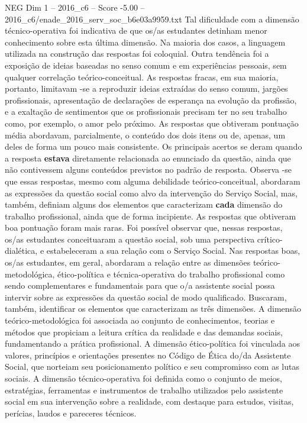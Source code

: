 \begin{textsample}{NEG Dim 1 – 2016\_c6 – Score -5.00 – 2016\_c6/enade\_2016\_serv\_soc\_b6e03a9959.txt}
Tal dificuldade com a dimensão técnico-operativa foi indicativa de que os/as estudantes detinham menor conhecimento sobre esta última dimensão.
Na maioria dos casos, a linguagem utilizada na construção das respostas foi coloquial.
Outra tendência foi a exposição de ideias baseadas no senso comum e em experiências pessoais, sem qualquer correlação teórico-conceitual.
As respostas fracas, em sua maioria, portanto, limitavam -se a reproduzir ideias extraídas do senso comum, jargões profissionais, apresentação de declarações de esperança na evolução da profissão, e a exaltação de sentimentos que os profissionais precisam ter no seu trabalho como, por exemplo, o amor pelo próximo.
As respostas que obtiveram pontuação média abordavam, parcialmente, o conteúdo dos dois itens ou de, apenas, um deles de forma um pouco mais consistente.
Os principais acertos se deram quando a resposta \textbf{estava} diretamente relacionada ao enunciado da questão, ainda que não contivessem alguns conteúdos previstos no padrão de resposta.
Observa -se que essas respostas, mesmo com alguma debilidade teórico-conceitual, abordaram as expressões da questão social como alvo da intervenção do Serviço Social, mas, também, definiam alguns dos elementos que caracterizam \textbf{cada} dimensão do trabalho profissional, ainda que de forma incipiente.
As respostas que obtiveram boa pontuação foram mais raras.
Foi possível observar que, nessas respostas, os/as estudantes conceituaram a questão social, sob uma perspectiva crítico-dialética, e estabeleceram a sua relação com o Serviço Social.
Nas respostas boas, os/as estudantes, em geral, abordaram a relação entre as dimensões teórico-metodológica, ético-política e técnica-operativa do trabalho profissional como sendo complementares e fundamentais para que o/a assistente social possa intervir sobre as expressões da questão social de modo qualificado.
Buscaram, também, identificar os elementos que caracterizam as três dimensões.
A dimensão teórico-metodológica foi associada ao conjunto de conhecimentos, teorias e métodos que propiciam a leitura crítica da realidade e das demandas sociais, fundamentando a prática profissional.
A dimensão ético-política foi vinculada aos valores, princípios e orientações presentes no Código de Ética do/da Assistente Social, que norteiam seu posicionamento político e seu compromisso com as lutas sociais.
A dimensão técnico-operativa foi definida como o conjunto de meios, estratégias, ferramentas e instrumentos de trabalho utilizados pelo assistente social em sua intervenção sobre a realidade, com destaque para estudos, visitas, perícias, laudos e pareceres técnicos.

\end{textsample}
